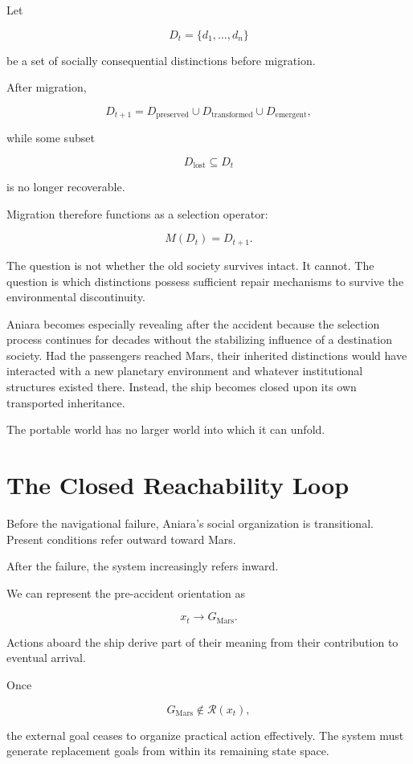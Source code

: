 \documentclass[11pt,oneside]{book}
\theoremstyle{definition}
\theoremstyle{remark}
\newcommand{\R}{\mathcal{R}}
\begin{document}
Let

\[
D_t=\{d_1,\ldots,d_n\}
\]

be a set of socially consequential distinctions before migration.

After migration,

\[
D_{t+1}
=
D_{\mathrm{preserved}}
\cup
D_{\mathrm{transformed}}
\cup
D_{\mathrm{emergent}},
\]

while some subset

\[
D_{\mathrm{lost}}
\subseteq D_t
\]

is no longer recoverable.

Migration therefore functions as a selection operator:

\[
M(D_t)
=
D_{t+1}.
\]

The question is not whether the old society survives intact. It cannot. The question is which distinctions possess sufficient repair mechanisms to survive the environmental discontinuity.

Aniara becomes especially revealing after the accident because the selection process continues for decades without the stabilizing influence of a destination society. Had the passengers reached Mars, their inherited distinctions would have interacted with a new planetary environment and whatever institutional structures existed there. Instead, the ship becomes closed upon its own transported inheritance.

The portable world has no larger world into which it can unfold.

\section{The Closed Reachability Loop}

Before the navigational failure, Aniara's social organization is transitional. Present conditions refer outward toward Mars.

After the failure, the system increasingly refers inward.

We can represent the pre-accident orientation as

\[
x_t
\rightarrow
G_{\mathrm{Mars}}.
\]

Actions aboard the ship derive part of their meaning from their contribution to eventual arrival.

Once

\[
G_{\mathrm{Mars}}\notin\R(x_t),
\]

the external goal ceases to organize practical action effectively. The system must generate replacement goals from within its remaining state space.
\end{document}
